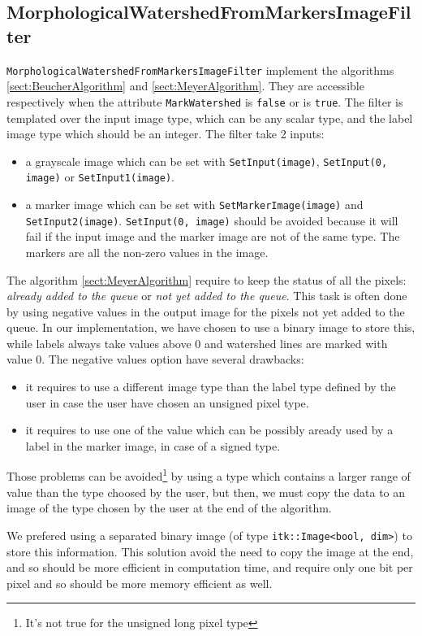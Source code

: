 \documentclass{InsightArticle}
\begin{document}
  \subsection{MorphologicalWatershedFromMarkersImageFilter}

\verb$MorphologicalWatershedFromMarkersImageFilter$ implement the
algorithms \ref{sect:BeucherAlgorithm} and \ref{sect:MeyerAlgorithm}.
They are accessible respectively when the attribute \verb$MarkWatershed$
is \verb$false$ or is \verb$true$. The filter is templated over the
input image type, which can be any scalar type, and the label image type
which should be an integer. The filter take 2 inputs:
\begin{itemize}
  \item a grayscale image which can be set with \verb$SetInput(image)$,
\verb$SetInput(0, image)$ or \verb$SetInput1(image)$.
  \item a marker image which can be set with \verb$SetMarkerImage(image)$
and \verb$SetInput2(image)$. \verb$SetInput(0, image)$ should be avoided
because it will fail if the input image and the marker image are not of the
same type. The markers are all the non-zero values in the image.
\end{itemize}

The algorithm \ref{sect:MeyerAlgorithm} require to keep the status of all
the pixels: {\em already added to the queue} or {\em not yet added to the queue}.
This task is often done by using negative values in the output image
for the pixels not yet added to the queue. In our implementation, we have
chosen to use a binary image to store this, while labels always take values
above 0 and watershed lines are marked with value 0. The negative values
option have several drawbacks:
\begin{itemize}
  \item it requires to use a different image type than the label type defined
by the user in case the user have chosen an unsigned pixel type.
  \item it requires to use one of the value which can be possibly aready used
by a label in the marker image, in case of a signed type.
\end{itemize}
Those problems can be avoided\footnote{It's not true for the unsigned long
pixel type} by using a type which contains a larger range of value than the
type choosed by the user, but then, we must copy the data to an image of
the type chosen by the user at the end of the algorithm.

We prefered using a separated binary image (of type \verb$itk::Image<bool, dim>$)
to store this information. This solution avoid the need to copy the image at
the end, and so should be more efficient in computation time, and require only
one bit per pixel and so should be more memory efficient as well.
\end{document}
